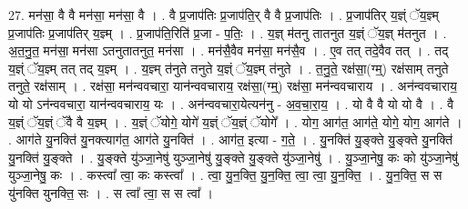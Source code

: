 \documentclass[17pt]{extarticle}
\begin{document}
27. मन॑सा॒ वै वै मन॑सा॒ मन॑सा॒ वै । . वै प्र॒जाप॑तिः प्र॒जाप॑ति॒र् वै वै प्र॒जाप॑तिः । . प्र॒जाप॑तिर् य॒ज्ञ्ं ॅय॒ज्ञ्म् प्र॒जाप॑तिः प्र॒जाप॑तिर् य॒ज्ञ्म् । . प्र॒जाप॑ति॒रिति॑ प्र॒जा - प॒तिः॒ । . य॒ज्ञ् म॑तनु तातनुत य॒ज्ञ्ं ॅय॒ज्ञ् म॑तनुत । . अ॒त॒नु॒त॒ मन॑सा॒ मन॑सा ऽतनुतातनुत॒ मन॑सा । . मन॑सै॒वैव मन॑सा॒ मन॑सै॒व । . ए॒व तत् तदे॒वैव तत् । . तद् य॒ज्ञ्ं ॅय॒ज्ञ्म् तत् तद् य॒ज्ञ्म् । . य॒ज्ञ्म् त॑नुते तनुते य॒ज्ञ्ं ॅय॒ज्ञ्म् त॑नुते । . त॒नु॒ते॒ रक्ष॑सा॒(ग्म्॒) रक्ष॑साम् तनुते तनुते॒ रक्ष॑साम् । . रक्ष॑सा॒ मन॑न्ववचारा॒ यान॑न्ववचाराय॒ रक्ष॑सा॒(ग्म्॒) रक्ष॑सा॒ मन॑न्ववचाराय । . अन॑न्ववचाराय॒ यो यो ऽन॑न्ववचारा॒ यान॑न्ववचाराय॒ यः । . अन॑न्ववचारा॒येत्यन॑नु - अ॒व॒चा॒रा॒य॒ । . यो वै वै यो यो वै । . वै य॒ज्ञ्ं ॅय॒ज्ञ्ं ॅवै वै य॒ज्ञ्म् । . य॒ज्ञ्ं ॅयोगे॒ योगे॑ य॒ज्ञ्ं ॅय॒ज्ञ्ं ॅयोगे᳚ । . योग॒ आग॑त॒ आग॑ते॒ योगे॒ योग॒ आग॑ते । . आग॑ते यु॒नक्ति॑ यु॒नक्त्याग॑त॒ आग॑ते यु॒नक्ति॑ । . आग॑त॒ इत्या - ग॒ते॒ । . यु॒नक्ति॑ यु॒ङ्क्ते यु॒ङ्क्ते यु॒नक्ति॑ यु॒नक्ति॑ यु॒ङ्क्ते । . यु॒ङ्क्ते यु॑ञ्जा॒नेषु॑ युञ्जा॒नेषु॑ यु॒ङ्क्ते यु॒ङ्क्ते यु॑ञ्जा॒नेषु॑ । . यु॒ञ्जा॒नेषु॒ कः को यु॑ञ्जा॒नेषु॑ युञ्जा॒नेषु॒ कः । . कस्त्वा᳚ त्वा॒ कः कस्त्वा᳚ । . त्वा॒ यु॒न॒क्ति॒ यु॒न॒क्ति॒ त्वा॒ त्वा॒ यु॒न॒क्ति॒ । . यु॒न॒क्ति॒ स स यु॑नक्ति युनक्ति॒ सः । . स त्वा᳚ त्वा॒ स स त्वा᳚ । \newline
\end{document}
